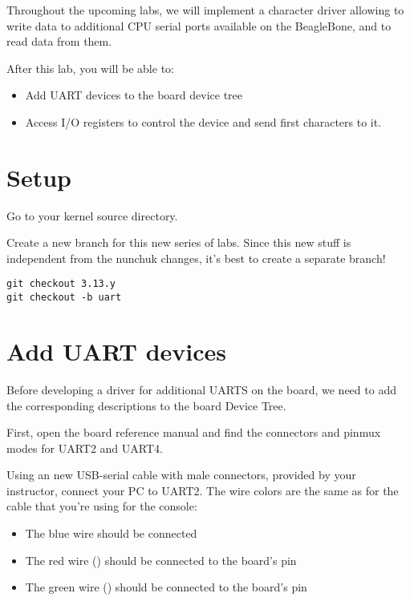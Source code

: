 
Throughout the upcoming labs, we will implement a character driver
allowing to write data to additional CPU serial ports available on
the BeagleBone, and to read data from them.

After this lab, you will be able to:

\begin{itemize}
\item Add UART devices to the board device tree
\item Access I/O registers to control the device and
      send first characters to it.
\end{itemize}

\section{Setup}

Go to your kernel source directory.

Create a new branch for this new series of labs. Since this new stuff
is independent from the nunchuk changes, it's best to create a separate
branch!

\begin{verbatim}
git checkout 3.13.y
git checkout -b uart
\end{verbatim}

\section{Add UART devices}

Before developing a driver for additional UARTS on the board, we
need to add the corresponding descriptions to the board Device Tree.

First, open the board reference manual and find the connectors
and pinmux modes for UART2 and UART4.

Using an new USB-serial cable with male connectors, provided by your
instructor, connect your PC to UART2. The wire colors are the same
as for the cable that you're using for the console:

\begin{itemize}
\item The blue wire should be connected  
\item The red wire () should be connected to the board's  pin
\item The green wire () should be connected to the board's  pin
\end{itemize}

